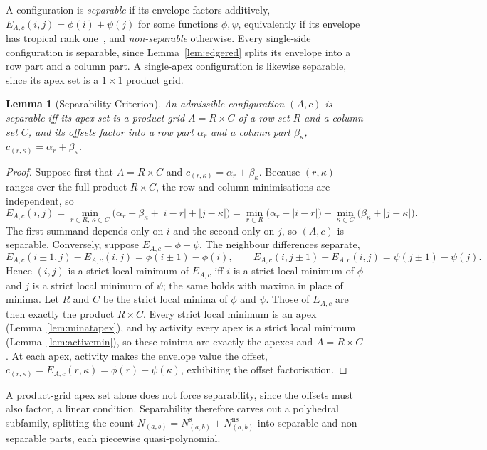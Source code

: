 \documentclass[11pt]{article}
\newtheorem{lemma}[theorem]{Lemma}
\theoremstyle{definition}
\theoremstyle{remark}
\begin{document}
A configuration is \emph{separable} if its envelope factors additively,
$E_{A,c}(i,j)=\phi(i)+\psi(j)$ for some functions $\phi,\psi$, equivalently if its
envelope has tropical rank one~\cite{DevelinSantosSturmfels2005}, and
\emph{non-separable} otherwise. Every single-side configuration is separable, since
Lemma~\ref{lem:edgered} splits its envelope into a row part and a column part. A
single-apex configuration is likewise separable, since its apex set is a $1\times1$ product
grid.

\begin{lemma}[Separability Criterion]\label{lem:sep}
An admissible configuration $(A,c)$ is separable iff its
apex set is a product grid $A=R\times C$ of a row set $R$ and a column set $C$,
and its offsets factor into a row part $\alpha_r$ and a column part
$\beta_\kappa$, $c_{(r,\kappa)}=\alpha_r+\beta_\kappa$.
\end{lemma}

\begin{proof}
Suppose first that $A=R\times C$ and $c_{(r,\kappa)}=\alpha_r+\beta_\kappa$.
Because $(r,\kappa)$ ranges over the full product $R\times C$, the row and column
minimisations are independent, so
\[
  E_{A,c}(i,j)=\min_{r\in R,\,\kappa\in C}\big(\alpha_r+\beta_\kappa+|i-r|+|j-\kappa|\big)
        =\min_{r\in R}\big(\alpha_r+|i-r|\big)+\min_{\kappa\in C}\big(\beta_\kappa+|j-\kappa|\big).
\]
The first summand depends only on $i$ and the second only on $j$, so $(A,c)$ is
separable. Conversely, suppose $E_{A,c}=\phi+\psi$. The neighbour differences
separate,
\[
  E_{A,c}(i\pm1,j)-E_{A,c}(i,j)=\phi(i\pm1)-\phi(i),\qquad
  E_{A,c}(i,j\pm1)-E_{A,c}(i,j)=\psi(j\pm1)-\psi(j).
\]
Hence $(i,j)$ is a strict local minimum of $E_{A,c}$ iff $i$ is a strict
local minimum of $\phi$ and $j$ is a strict local minimum of $\psi$; the same holds
with maxima in place of minima. Let $R$ and
$C$ be the strict local minima of $\phi$ and $\psi$. Those of $E_{A,c}$ are then exactly the product $R\times C$. Every strict local
minimum is an apex (Lemma~\ref{lem:minatapex}), and by activity every apex is a
strict local minimum (Lemma~\ref{lem:activemin}), so these minima are exactly the
apexes and $A=R\times C$. At each apex, activity makes the envelope value the offset,
$c_{(r,\kappa)}=E_{A,c}(r,\kappa)=\phi(r)+\psi(\kappa)$, exhibiting the offset
factorisation.
\end{proof}

A product-grid apex set alone does not force separability, since the offsets must
also factor, a linear condition. Separability therefore carves out a
polyhedral subfamily, splitting the count
$N_{(a,b)}=N^{\mathrm{s}}_{(a,b)}+N^{\mathrm{ns}}_{(a,b)}$ into separable and
non-separable parts, each piecewise quasi-polynomial.
\end{document}
